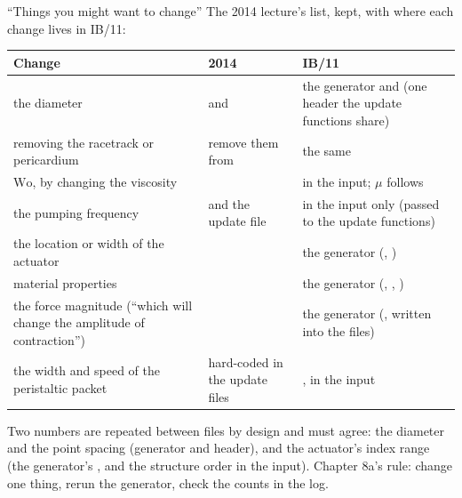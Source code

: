 \documentclass[aspectratio=169,11pt]{beamer}
\begin{document}
\begin{frame}{``Things you might want to change''}
\label{fr:change}
\small The 2014 lecture's list, kept, with where each change lives in IB/11:
\vspace{1mm}

\scriptsize
\begin{tabular}{@{}L{0.3\textwidth}L{0.3\textwidth}L{0.32\textwidth}@{}}
\toprule
Change & 2014 & IB/11\\
\midrule
the diameter &  and  & the generator and  (one header the update functions share)\\
removing the racetrack or pericardium & remove them from  & the same\\
$\mathrm{Wo}$, by changing the viscosity &  &  in the input; $\mu$ follows\\
the pumping frequency &  and the update file &  in the input only (passed to the update functions)\\
the location or width of the actuator &  & the generator (, )\\
material properties &  & the generator (, , )\\
the force magnitude (``which will change the amplitude of contraction'') &  & the generator (, written into the  files)\\
the width and speed of the peristaltic packet & hard-coded in the update files & ,  in the input\\
\bottomrule
\end{tabular}

\vspace{1mm}
\footnotesize Two numbers are repeated between files by design and must agree: the diameter and the point spacing (generator and header), and the actuator's index range (the generator's ,  and the structure order in the input). Chapter 8a's rule: change one thing, rerun the generator, check the counts in the log.
\end{frame}
\end{document}
